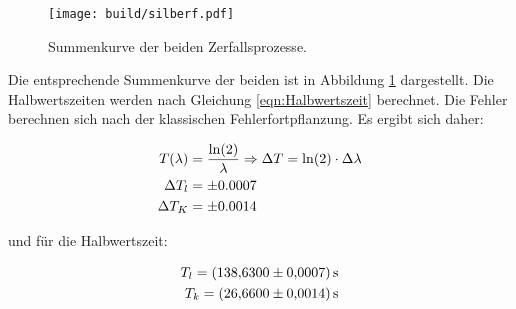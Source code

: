  \begin{figure}
   \centering
   \texttt{[image: build/silberf.pdf]}
   \caption{Summenkurve der beiden Zerfallsprozesse.}
   \label{fig:silberf}
 \end{figure}
\FloatBarrier
Die entsprechende Summenkurve der beiden ist in Abbildung \ref{fig:silberf} dargestellt.
Die Halbwertszeiten werden nach Gleichung \eqref{eqn:Halbwertszeit} berechnet.
Die Fehler berechnen sich nach der klassischen Fehlerfortpflanzung.
Es ergibt sich daher:

\begin{align}
  T(\lambda) &= \frac{\ln(2)}{\lambda} \Rightarrow \Delta T = \ln(2) \cdot \Delta \lambda \label{eqn:deltaT}\\
  \Delta T_l &= \pm 0.0007 \notag\\
  \Delta T_K &= \pm 0.0014 \notag
\end{align}

und für die Halbwertszeit:

\begin{align*}
  T_l = \SI{138.63 \pm 0.0007}{\second} \\
  T_k = \SI{26.66 \pm 0.0014}{\second}
\end{align*}
